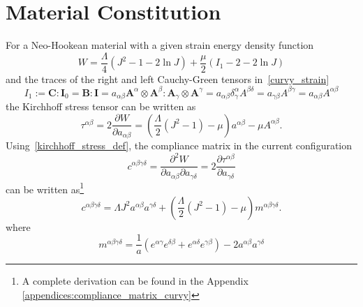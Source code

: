 \section{Material Constitution}
For a Neo-Hookean material with a given strain energy density function
\begin{equation}\label{eq:NH_strain}
    W = \frac{\Lambda}{4} \left( J^{2} - 1 - 2 \ln{J} \right) + \frac{\mu}{2} \left( I_{1} - 2 - 2 \ln{J} \right) 
\end{equation}
%
and the traces of the right and left Cauchy-Green tensors in~\eqref{curvy_strain}
\begin{equation}\label{eq:CGtrace}
    I_{1} := \boldsymbol{C} : \boldsymbol{I}_{0} = \boldsymbol{B} : \boldsymbol{I} = a_{\alpha \beta} \boldsymbol{A}^{\alpha} \otimes \boldsymbol{A}^{\beta} : \boldsymbol{A}_{\gamma} \otimes \boldsymbol{A}^{\gamma} = a_{\alpha \beta} \delta^{\alpha}_{\gamma} A^{\beta \delta} = a_{\gamma \beta} A^{\beta \gamma} = a_{\alpha \beta} A^{\alpha \beta}
\end{equation}
the Kirchhoff stress tensor can be written as 
\begin{equation}\label{kirchhoff_stress_def}
        \tau^{\alpha \beta} = 2 \frac{\partial W}{\partial a_{\alpha \beta}} = \left( \frac{\Lambda}{2} \left( J^{2} - 1 \right) - \mu \right) a^{\alpha \beta} - \mu A^{\alpha \beta}.
\end{equation}
Using~\eqref{kirchhoff_stress_def}, the compliance matrix in the current configuration
\begin{equation}\label{curvy_compliance_current_def}
    c^{\alpha \beta \gamma \delta} = \frac{\partial^{2} W}{\partial a_{\alpha \beta} \partial a_{\gamma \delta}} = 2 \frac{\partial \tau^{\alpha \beta}}{\partial a_{\gamma \delta}}
\end{equation}
%
can be written as\footnote{A complete derivation can be found in the Appendix \ref{appendices:compliance_matrix_curvy}}
\begin{equation}\label{curvy_compliance_current}
        c^{\alpha \beta \gamma \delta} = \Lambda J^{2} a^{\alpha \beta} a^{\gamma \delta} + \left( \frac{\Lambda}{2} \left( J^{2} - 1 \right) - \mu \right) m^{\alpha \beta \gamma \delta}.
\end{equation}
where
\begin{equation} \label{mabgd}
    m^{\alpha \beta \gamma \delta} = \frac{1}{a} \left( e^{\alpha \gamma} e^{\delta \beta} + e^{\alpha \delta} e^{\gamma \beta} \right) - 2 a^{\alpha \beta} a^{\gamma \delta}
\end{equation}
%
